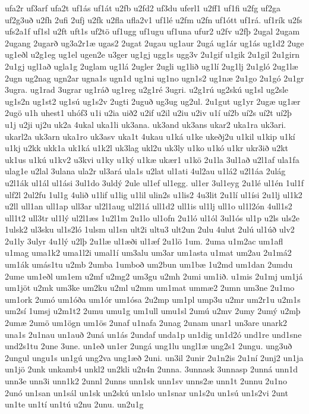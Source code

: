 {ufa2r
uf3arf
ufa2t
uf1ás
uf1át
u2fb
u2fd2
uf3du
uferl1
u2ff1
uf1fi
u2fg
uf2ga
uf2g3uð
u2fh
2ufi
2ufj
u2fk
u2fla
ufla2v1
uf1lé
u2fm
u2fn
uf1ótt
uf1rá.
uf1rík
u2fs
ufs2a1f
uf1sl
u2ft
uft1s
uf2tö
uf1ugg
uf1ugu
uf1una
ufur2
u2fv
u2fþ
2ugal
2ugam
2ugang
2ugarð
ug3a2r1æ
ugas2
2ugat
2ugau
ug1aur
2ugá
ug1ár
ug1ás
ug1d2
2uge
ug1eðl
u2g1eg
ug1el
ugen2e
u3ger
ug1gj
ugg1s
ugg3v
2u1gif
u1gik
2u1gil
2u1girn
2u1gj
ugl1að
ugla1g
2uglam
ug1lá
2ugler
2ugli
ug1lið
ug1lí
2ug1lj
2u1gló
2ug1læ
2ugn
ug2nag
ugn2ar
ugna1s
ugn1d
ug1ni
ug1no
ugn1s2
ug1næ
2u1go
2u1gó
2u1gr
3ugra.
ug1rad
3ugrar
ug1ráð
ug1reg
u2g1ré
3ugri.
u2g1rú
ug2skú
ug1sl
ug2sle
ug1s2n
ug1st2
ug1sú
ug1s2v
2ugti
2uguð
ug3ug
ug2ul.
2u1gut
ug1yr
2ugæ
ug1ær
2ugö
u1h
uhest1
uhóf3
u1i
u2ia
uið2
u2if
u2il
u2iu
u2iv
u1í
uí2b
uí2s
uí2t
uí2þ
u1j
u2ji
uj2u
uk2a
4ukal
uka1li
uk3ana.
uk3and
uk3ans
ukar2
uka1ra
uk3ari.
ukarl2a
uk3arn
uka1ro
uk3asv
uka1t
4ukau
u1ká
u1ke
ukeðj2u
u1kil
u1kip
u1kí
u1kj
u2kk
ukk1a
uk1ká
u1k2l
uk3lag
ukl2u
uk3ly
u1ko
u1kó
u1kr
ukr3ið
u2kt
uk1us
u1kú
u1kv2
u3kvi
u1ky
u1ký
u1kæ
ukær1
u1kö
2u1la
3ul1að
u2l1af
ula1fa
ulag1e
u2lal
3ulana
ula2r
ul3ará
ula1s
u2lat
ul1ati
4ul2au
u1lá2
u2l1áa
2ulág
u2l1ák
ul1ál
ul1ási
3ul1do
3uldý
2ule
ul1ef
ul1egg.
ul1er
3ul1eyg
2u1lé
ul1én
1ul1f
ulf2l
2ul2fu
1ul1g
4ulið
u1lif
u1lig
u1lil
ulin2s
u1lis2
4u3lit
2u1lí
ul1ísi
2u1lj
ul1k2
u2ll
ull1an
ull1ap
ull3ar
ul2l1aug
ul2l1á
ull1d2
ull1is
ul1lj
ull1o
ul1l2ón
4ull1s2
ull1t2
ull3tr
ul1lý
ul2l1æs
1u2l1m
2u1lo
ul1ofn
2u1ló
ul1ól
3ul1ós
ul1p
u2ls
uls2e
1ulsk2
ul3sku
ul1s2ló
1ulsm
ul1sn
ult2i
ultu3
ult2un
2ulu
4ulut
2ulú
ul1úð
ulv2
2u1ly
3ulyr
4u1lý
u2lþ
2u1læ
ul1æði
ul1æf
2u1lö
1um.
2uma
u1m2ac
um1afl
u1mag
uma1k2
uma1l2i
umal1í
um3alu
um3ar
um1asta
u1mat
um2au
2u1má2
um1ák
umás1tu
u2mb
2umba
1umboð
um2bun
um1bæ
1u2md
um1dan
2umdu
2ume
um1eðl
um1em
u2mf
u2mg2
um3gu
u2mh
2umi
um1ið.
u1mis
2u1mj
um1já
um1jöt
u2mk
um3ke
um2ku
u2ml
u2mm
um1mat
ummæ2
2umn
um3ne
2u1mo
um1ork
2umó
um1óða
um1ór
um1ósa
2u2mp
um1pl
ump3u
u2mr
um2r1u
u2m1s
um2sí
1umsj
u2m1t2
2umu
umu1g
um1ull
umu1sl
2umú
u2mv
2umy
2umý
u2mþ
2umæ
2umö
um1ögn
um1ös
2unaf
u1nafa
2unag
2unam
unar1
un3are
unark2
una1s
2u1nau
un1auð
2uná
un1ás
2undaf
unda1p
un1dig
un1d2ó
und1re
und1sne
und2s1tu
2une
3une.
un1eð
un1er
2ungá
ung1lu
ungl1æ
ung2s1
2ungu.
ung3uð
2ungul
ungu1s
un1gú
ung2va
ung1æð
2uni.
un3il
2unir
2u1n2is
2u1ní
2unj2
un1ja
un1jö
2unk
unkamb4
unkl2
un2kli
u2n4n
2unna.
3unnask
3unnasp
2unná
unn1d
unn3e
unn3i
unn1k2
2unnl
2unns
unn1sk
unn1sv
unns2æ
unn1t
2unnu
2u1no
2unó
un1san
un1sál
un1sk
un2skú
un1slo
un1snar
un1s2u
un1sú
un1s2vi
2unt
un1te
un1tí
un1tú
u2nu
2unu.
un2u1g
}
